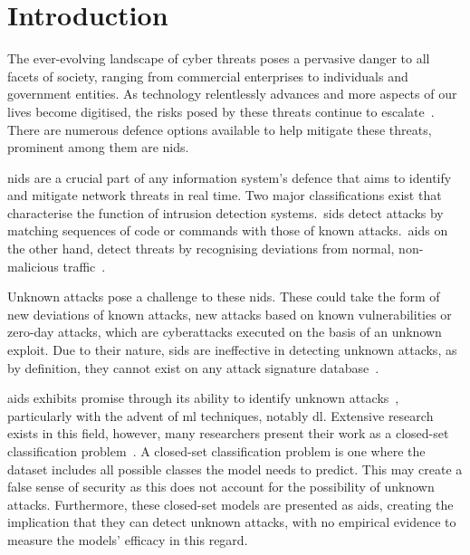 \chapter{Introduction}%
\label{chp:introduction}

The ever-evolving landscape of cyber threats poses a pervasive danger to all
facets of society, ranging from commercial enterprises to individuals and
government entities. As technology relentlessly advances and more aspects of
our lives become digitised, the risks posed by these threats continue to
escalate~\cite{ENISA}. There are numerous defence options available to help
mitigate these threats, prominent among them are \gls{nids}.

\gls{nids} are a crucial part of any information system's defence that aims to
identify and mitigate network threats in real time. Two major
classifications exist that characterise the function of intrusion detection
systems.\ \gls{sids} detect attacks by matching sequences of code or commands
with those of known attacks.\ \gls{aids} on the other hand, detect threats by
recognising deviations from normal, non-malicious traffic~\cite{survey1}.

Unknown attacks pose a challenge to these \gls{nids}. These could take the form
of new deviations of known attacks, new attacks based on known vulnerabilities
or zero-day attacks, which are cyberattacks executed on the basis of an unknown
exploit. Due to their nature, \gls{sids} are ineffective in detecting unknown
attacks, as by definition, they cannot exist on any attack signature
database~\cite{survey1}.

\gls{aids} exhibits promise through its ability to identify unknown
attacks~\cite{aids-unseen}, particularly with the advent of \gls{ml}
techniques, notably \gls{dl}. Extensive research exists in this field, however,
many researchers present their work as a closed-set classification
problem~\cite{zero-day}. A closed-set classification problem is one where the
dataset includes all possible classes the model needs to predict. This may
create a false sense of security as this does not account for the possibility
of unknown attacks. Furthermore, these closed-set models are presented as
\gls{aids}, creating the implication that they can detect unknown attacks, with
no empirical evidence to measure the models' efficacy in this regard.
